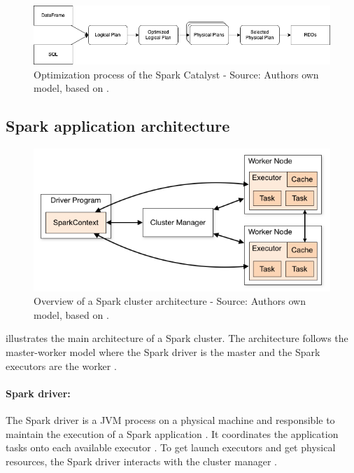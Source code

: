 \begin{figure}[h]
\centering
\includegraphics[scale=0.5]{images/04_technical_background/spark_catalyst}
\caption{Optimization process of the Spark Catalyst - Source: Authors own model, based on \cite{Hien2018Spark}.}
\label{fig:spark_catalyst_process}
\end{figure}


\subsection{Spark application architecture}

\begin{figure}[h]
\centering
\includegraphics[scale=0.5]{images/04_technical_background/cluster_overview}
\caption{Overview of a Spark cluster architecture - Source: Authors own model, based on \cite{Apache2020Spark}.}
\label{fig:spark_cluster_overview}
\end{figure}

 illustrates the main architecture of a Spark cluster. The architecture follows the master-worker model where the Spark driver is the master and the Spark executors are the worker \cite{Hien2018Spark}.

\paragraph{Spark driver:}
The Spark driver is a JVM process on a physical machine and responsible to maintain the execution of a Spark application \cite{Chambers2018Spark}. It coordinates the application tasks onto each available executor \cite{Hien2018Spark}. To get launch executors and get physical resources, the Spark driver interacts with the cluster manager \cite{Chambers2018Spark, Hien2018Spark}.


